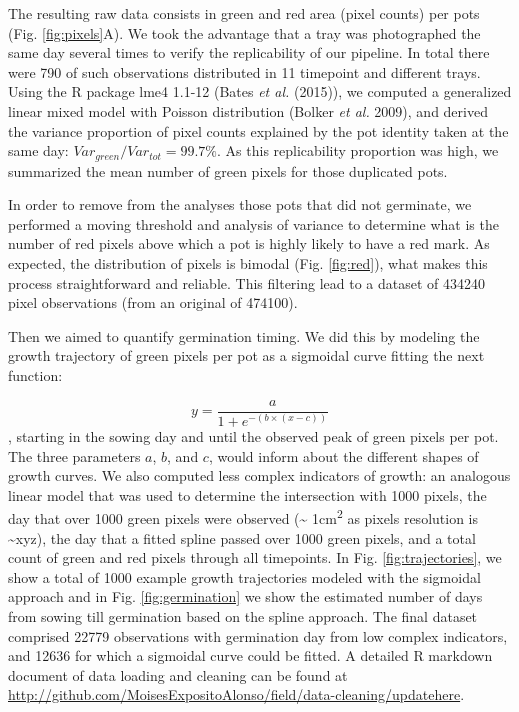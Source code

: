 \documentclass[12pt,]{article}
\begin{document}
The resulting raw data consists in green and red area (pixel counts) per
pots (Fig. \ref{fig:pixels}A). We took the advantage that a tray was
photographed the same day several times to verify the replicability of
our pipeline. In total there were 790 of such observations distributed
in 11 timepoint and different trays. Using the R package lme4 1.1-12
(Bates \emph{et al.} (2015)), we computed a generalized linear mixed
model with Poisson distribution (Bolker \emph{et al.} 2009), and derived
the variance proportion of pixel counts explained by the pot identity
taken at the same day: \(Var_{green} / Var_{tot} = 99.7 \%\). As this
replicability proportion was high, we summarized the mean number of
green pixels for those duplicated pots.

In order to remove from the analyses those pots that did not germinate,
we performed a moving threshold and analysis of variance to determine
what is the number of red pixels above which a pot is highly likely to
have a red mark. As expected, the distribution of pixels is bimodal
(Fig. \ref{fig:red}), what makes this process straightforward and
reliable. This filtering lead to a dataset of 434240 pixel observations
(from an original of 474100).

Then we aimed to quantify germination timing. We did this by modeling
the growth trajectory of green pixels per pot as a sigmoidal curve
fitting the next function:

\[y = \frac{a}{1 + e^{-(b  \times   (x-c))} } \] , starting in the
sowing day and until the observed peak of green pixels per pot. The
three parameters \(a\), \(b\), and \(c\), would inform about the
different shapes of growth curves. We also computed less complex
indicators of growth: an analogous linear model that was used to
determine the intersection with 1000 pixels, the day that over 1000
green pixels were observed (\textasciitilde{} 1cm\textsuperscript{2} as
pixels resolution is \textasciitilde{}xyz), the day that a fitted spline
passed over 1000 green pixels, and a total count of green and red pixels
through all timepoints. In Fig. \ref{fig:trajectories}, we show a total
of 1000 example growth trajectories modeled with the sigmoidal approach
and in Fig. \ref{fig:germination} we show the estimated number of days
from sowing till germination based on the spline approach. The final
dataset comprised 22779 observations with germination day from low
complex indicators, and 12636 for which a sigmoidal curve could be
fitted. A detailed R markdown document of data loading and cleaning can
be found at
\url{http://github.com/MoisesExpositoAlonso/field/data-cleaning/updatehere}.
\end{document}
